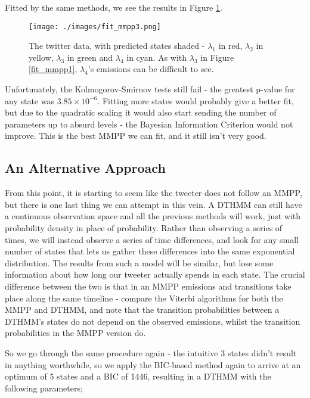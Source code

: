 Fitted by the same methods, we see the results in Figure \ref{fit_mmpp3}.

\begin{figure}[h!]
\texttt{[image: ./images/fit\_mmpp3.png]}
\caption{The twitter data, with predicted states shaded - $\lambda_1$ in red, $\lambda_2$ in yellow, $\lambda_3$ in green and $\lambda_4$ in cyan. As with $\lambda_3$ in Figure \ref{fit_mmpp1}, $\lambda_4$'s emissions can be difficult to see.}
\label{fit_mmpp3}
\end{figure}

Unfortunately, the Kolmogorov-Smirnov tests still fail - the greatest p-value for any state was $3.85 \times 10^{-6}$. Fitting more states would probably give a better fit, but due to the quadratic scaling it would also start sending the number of parameters up to absurd levels - the Bayesian Information Criterion would not improve. This is the best MMPP we can fit, and it still isn't very good.

\subsection{An Alternative Approach}

From this point, it is starting to seem like the tweeter does not follow an MMPP, but there is one last thing we can attempt in this vein. A DTHMM can still have a continuous observation space and all the previous methods will work, just with probability density in place of probability. Rather than observing a series of times, we will instead observe a series of time differences, and look for any small number of states that lets us gather these differences into the same exponential distribution. The results from such a model will be similar, but lose some information about how long our tweeter actually spends in each state. The crucial difference between the two is that in an MMPP emissions and transitions take place along the same timeline - compare the Viterbi algorithms for both the MMPP and DTHMM, and note that the transition probabilities between a DTHMM's states do not depend on the observed emissions, whilst the transition probabilities in the MMPP version do.

So we go through the same procedure again - the intuitive 3 states didn't result in anything worthwhile, so we apply the BIC-based method again to arrive at an optimum of 5 states and a BIC of 1446, resulting in a DTHMM with the following parameters;

